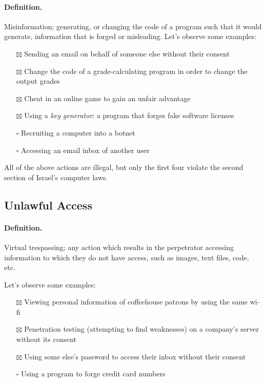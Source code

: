 \paragraph{Definition.} Misinformation; generating, or changing the code of a
program such that it would generate, information that is forged or misleading.
Let's observe some examples:
\begin{itemize}
    \item[$\boxtimes$] Sending an email on behalf of someone else without their
    consent
    \item[$\boxtimes$] Change the code of a grade-calculating program in order
    to change the output grades
    \item[$\boxtimes$] Cheat in an online game to gain an unfair advantage
    \item[$\boxtimes$] Using a \textit{key generator}: a program that forges
    fake software licenses
    \item[$\square$] Recruiting a computer into a botnet
    \item[$\square$] Accessing an email inbox of another user
\end{itemize}

All of the above actions are illegal, but only the first four violate the second
section of Israel's computer laws.

\subsection{Unlawful Access}

\paragraph{Definition.} Virtual trespassing; any action which results in the
perpetrator accessing information to which they do not have access, such as
images, text files, code, etc.

Let's observe some examples:
\begin{itemize}
    \item[$\boxtimes$] Viewing personal information of coffeehouse patrons by
    using the same wi-fi
    \item[$\boxtimes$] Penetration testing (attempting to find weaknesses) on a
    company's server without its consent
    \item[$\boxtimes$] Using some else's password to access their inbox without
    their consent
    \item[$\square$] Using a program to forge credit card numbers
\end{itemize}

